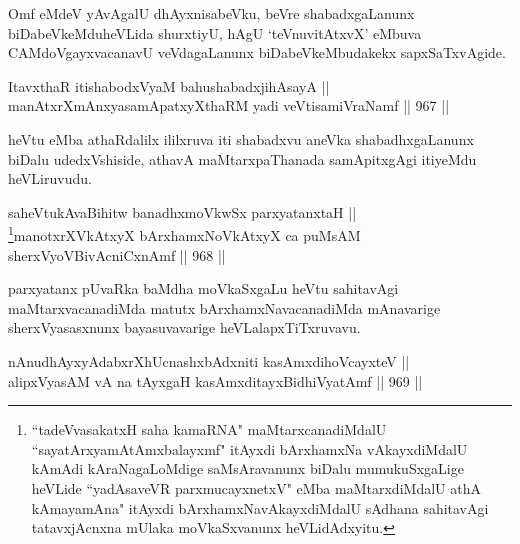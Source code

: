 
\begin{artha}
Omf eMdeV yAvAgalU dhAyxnisabeVku, beVre shabadxgaLanunx biDabeVkeMduheVLida shurxtiyU, hAgU `teV\s nuvitAtxvX' eMbuva CAMdoVgayxvacanavU veVdagaLanunx biDabeVkeMbudakekx sapxSaTxvAgide.
\end{artha}


\begin{shl}
ItavxthaR itishabodxV\s yaM bahushabadxjihAsayA || \\
manAtxrXmAnxyasamApatxyXthaRM yadi veVtisamiVraNamf \hfill || 967 ||  
\end{shl}

\begin{artha}
heVtu eMba athaRdalilx ililxruva iti shabadxvu aneVka shabadhxgaLanunx biDalu udedxVshiside, athavA maMtarxpaThanada samApitxgAgi itiyeMdu heVLiruvudu.
\end{artha}


\begin{shl}
saheVtukAvaBihitw banadhxmoVkwSx parxyatanxtaH || \\
\footnote{``tadeVvasakatxH saha kamaRNA" maMtarxcanadiMdalU ``sayatArxyamAtAmx\s balayxmf" itAyxdi bArxhamxNa vAkayxdiMdalU kAmAdi kAraNagaLoMdige saMsAravanunx biDalu mumukuSxgaLige heVLide ``yadAsaveVR parxmucayxnetxV" eMba maMtarxdiMdalU athA kAmayamAna" itAyxdi bArxhamxNavAkayxdiMdalU sAdhana sahitavAgi tatavxjAcnxna mUlaka moVkaSxvanunx heVLidAdxyitu.}manotxrXVkAtxyX bArxhamxNoVkAtxyX ca puMsAM sherxVyoVBivAcniCxnAmf \hfill || 968 ||  
\end{shl}


\begin{artha}
parxyatanx pUvaRka baMdha moVkaSxgaLu heVtu sahitavAgi maMtarxvacanadiMda matutx bArxhamxNavacanadiMda mAnavarige sherxVyasasxnunx bayasuvavarige heVLalapxTiTxruvavu.
\end{artha}


\begin{shl}
nAnudhAyxyAdabxrXhUcnashxbAdxniti kasAmxdihoVcayxteV || \\
alipxVyasAM vA na tAyxgaH kasAmxditayxBidhiVyatAmf \hfill || 969 ||  
\end{shl}


